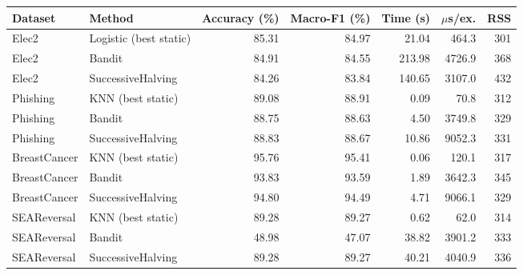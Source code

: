 \begin{tabular}{llrrrrr}
\toprule
Dataset & Method & Accuracy (\%) & Macro-F1 (\%) & Time (s) & $\mu$s/ex. & RSS \\
\midrule
Elec2 & Logistic (best static) & 85.31 & 84.97 & 21.04 & 464.3 & 301 \\
Elec2 & Bandit & 84.91 & 84.55 & 213.98 & 4726.9 & 368 \\
Elec2 & SuccessiveHalving & 84.26 & 83.84 & 140.65 & 3107.0 & 432 \\
Phishing & KNN (best static) & 89.08 & 88.91 & 0.09 & 70.8 & 312 \\
Phishing & Bandit & 88.75 & 88.63 & 4.50 & 3749.8 & 329 \\
Phishing & SuccessiveHalving & 88.83 & 88.67 & 10.86 & 9052.3 & 331 \\
BreastCancer & KNN (best static) & 95.76 & 95.41 & 0.06 & 120.1 & 317 \\
BreastCancer & Bandit & 93.83 & 93.59 & 1.89 & 3642.3 & 345 \\
BreastCancer & SuccessiveHalving & 94.80 & 94.49 & 4.71 & 9066.1 & 329 \\
SEAReversal & KNN (best static) & 89.28 & 89.27 & 0.62 & 62.0 & 314 \\
SEAReversal & Bandit & 48.98 & 47.07 & 38.82 & 3901.2 & 333 \\
SEAReversal & SuccessiveHalving & 89.28 & 89.27 & 40.21 & 4040.9 & 336 \\
\bottomrule
\end{tabular}
